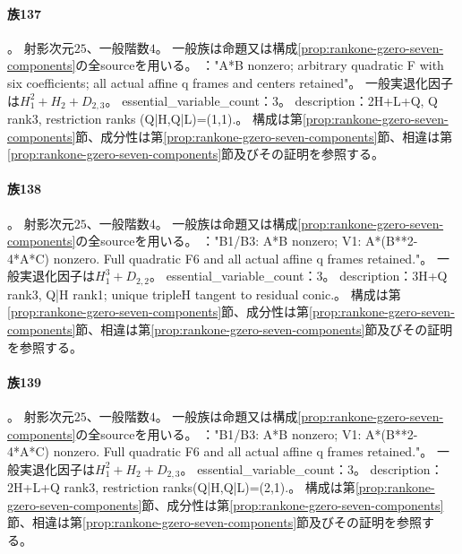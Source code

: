 \paragraph{族137}\label{catalogue:R4_MODULAR_RANK1_GZERO_BINOMIAL_B6_25}
。
射影次元$25$、一般階数$4$。
一般族は命題又は構成\ref{prop:rankone-gzero-seven-components}の全sourceを用いる。
："A*B nonzero; arbitrary quadratic F with six coefficients; all actual affine q frames and centers retained"。
一般実退化因子は$H_{1}^{2}+H_{2}+D_{2,3}$。
essential\_variable\_count：3。
description：2H+L+Q, Q rank3, restriction ranks (Q|H,Q|L)=(1,1).。
構成は第\ref{prop:rankone-gzero-seven-components}節、成分性は第\ref{prop:rankone-gzero-seven-components}節、相違は第\ref{prop:rankone-gzero-seven-components}節及びその証明を参照する。

\paragraph{族138}\label{catalogue:R4_MODULAR_RANK1_GZERO_B1_25}
。
射影次元$25$、一般階数$4$。
一般族は命題又は構成\ref{prop:rankone-gzero-seven-components}の全sourceを用いる。
："B1/B3: A*B nonzero; V1: A*(B**2-4*A*C) nonzero. Full quadratic F6 and all actual affine q frames retained."。
一般実退化因子は$H_{1}^{3}+D_{2,2}$。
essential\_variable\_count：3。
description：3H+Q rank3, Q|H rank1; unique tripleH tangent to residual conic.。
構成は第\ref{prop:rankone-gzero-seven-components}節、成分性は第\ref{prop:rankone-gzero-seven-components}節、相違は第\ref{prop:rankone-gzero-seven-components}節及びその証明を参照する。

\paragraph{族139}\label{catalogue:R4_MODULAR_RANK1_GZERO_B3_25}
。
射影次元$25$、一般階数$4$。
一般族は命題又は構成\ref{prop:rankone-gzero-seven-components}の全sourceを用いる。
："B1/B3: A*B nonzero; V1: A*(B**2-4*A*C) nonzero. Full quadratic F6 and all actual affine q frames retained."。
一般実退化因子は$H_{1}^{2}+H_{2}+D_{2,3}$。
essential\_variable\_count：3。
description：2H+L+Q rank3, restriction ranks(Q|H,Q|L)=(2,1).。
構成は第\ref{prop:rankone-gzero-seven-components}節、成分性は第\ref{prop:rankone-gzero-seven-components}節、相違は第\ref{prop:rankone-gzero-seven-components}節及びその証明を参照する。

